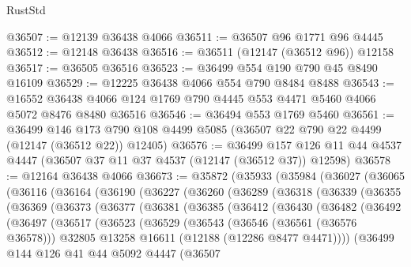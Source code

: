 \begin{lexlean}{RustStd}
\begin{coremodule}
@36507 := @12139 @36438 @4066
@36511 := @36507 @96 @1771 @96 @4445
@36512 := @12148 @36438
@36516 := @36511 (@12147 (@36512 @96)) @12158
@36517 := @36505 @36516
@36523 := @36499 @554 @190 @790 @45 @8490 @16109
@36529 := @12225 @36438 @4066 @554 @790 @8484 @8488
@36543 := @16552 @36438 @4066 @124 @1769 @790 @4445 @553 @4471 @5460 @4066 @5072 @8476 @8480 @36516
@36546 := @36494 @553 @1769 @5460
@36561 := @36499
    @146
    @173
    @790
    @108
    @4499
    @5085
    (@36507 @22 @790 @22 @4499 (@12147 (@36512 @22)) @12405)
@36576 := @36499
    @157
    @126
    @11
    @44
    @4537
    @4447
    (@36507 @37 @11 @37 @4537 (@12147 (@36512 @37)) @12598)
@36578 := @12164 @36438 @4066
@36673 := @35872
    (@35933
      (@35984
        (@36027
          (@36065
            (@36116
              (@36164
                (@36190
                  (@36227
                    (@36260
                      (@36289
                        (@36318
                          (@36339
                            (@36355
                              (@36369
                                (@36373
                                  (@36377
                                    (@36381
                                      (@36385
                                        (@36412
                                          (@36430
                                            (@36482
                                              (@36492
                                                (@36497
                                                  (@36517
                                                    (@36523
                                                      (@36529
                                                        (@36543
                                                          (@36546 (@36561 (@36576 @36578)))
                                                          @32805
                                                          @13258
                                                          @16611
                                                          (@12188 (@12286 @8477 @4471))))
                                                      (@36499
                                                        @144
                                                        @126
                                                        @41
                                                        @44
                                                        @5092
                                                        @4447
                                                        (@36507

\end{coremodule}
\end{lexlean}
